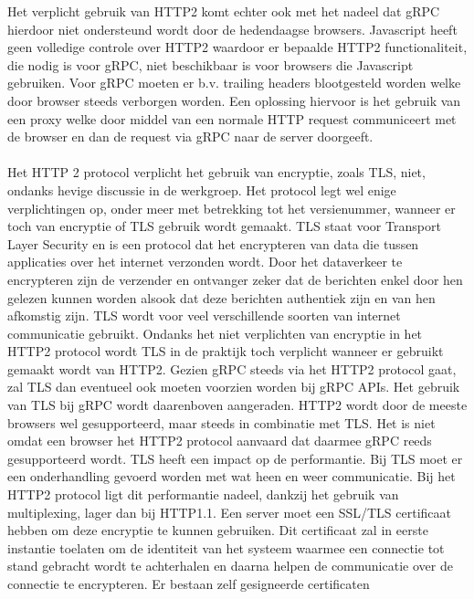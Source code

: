 Het verplicht gebruik van HTTP2 komt echter ook met het nadeel dat gRPC hierdoor niet ondersteund wordt door de hedendaagse browsers. Javascript heeft geen
volledige controle over HTTP2 waardoor er bepaalde HTTP2 functionaliteit, die nodig is voor gRPC, niet beschikbaar is voor browsers die Javascript gebruiken.
Voor gRPC moeten er b.v. trailing headers blootgesteld worden welke door browser steeds verborgen worden. Een oplossing hiervoor is het gebruik van een proxy welke
door middel van een normale HTTP request communiceert met de browser en dan de request via gRPC naar de server doorgeeft.\newline
~\autocite{altexsoftgrpc}\\
~\autocite{yukutakahashi}\\

Het HTTP 2 protocol verplicht het gebruik van encryptie, zoals TLS, niet, ondanks hevige discussie in de werkgroep. Het protocol legt wel enige verplichtingen op,
onder meer met betrekking tot het versienummer, wanneer er toch van encryptie of TLS gebruik wordt gemaakt. TLS staat voor Transport Layer Security en is een protocol
dat het encrypteren van data die tussen applicaties over het internet verzonden wordt. Door het dataverkeer te encrypteren zijn de verzender en ontvanger zeker dat
de berichten enkel door hen gelezen kunnen worden alsook dat deze berichten authentiek zijn en van hen afkomstig zijn. TLS wordt voor veel verschillende soorten van internet communicatie gebruikt.
Ondanks het niet verplichten van encryptie in het HTTP2 protocol wordt TLS in de praktijk toch verplicht wanneer er gebruikt gemaakt wordt van HTTP2.
Gezien gRPC steeds via het HTTP2 protocol gaat, zal TLS dan eventueel ook moeten voorzien worden bij gRPC APIs. Het gebruik van TLS bij gRPC wordt daarenboven aangeraden.
HTTP2 wordt door de meeste browsers wel gesupporteerd, maar steeds in combinatie met TLS. Het is niet omdat een browser het HTTP2 protocol aanvaard dat daarmee gRPC reeds
gesupporteerd wordt.\newline
TLS heeft een impact op de performantie. Bij TLS moet er een onderhandling gevoerd worden met wat heen en weer communicatie. Bij het HTTP2 protocol ligt dit performantie nadeel,
dankzij het gebruik van multiplexing, lager dan bij HTTP1.1.
Een server moet een SSL/TLS certificaat hebben om deze encryptie te kunnen gebruiken. Dit certificaat zal in eerste instantie toelaten om de identiteit van het systeem
waarmee een connectie tot stand gebracht wordt te achterhalen en daarna helpen de communicatie over de connectie te encrypteren. Er bestaan zelf gesigneerde certificaten
